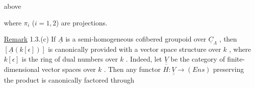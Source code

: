 \begin{center}
  above  
\end{center}
where  $\pi_{i}$  ($i = 1,2$)  are projections.

\underline{Remark} 1.3.(c)  If  $\underline{A}$  is a semi-homogeneous cofibered groupoid over  $\underline{C}_{\Lambda}$ , then
 $[\underline{A}(k [\epsilon])]$ is canonically provided with a vector space structure over  $k$ , where
$k [\epsilon]$ is the ring of dual numbers over  $k$ . Indeed, let  $\underline{\underline{V}}$  be the category of
finite-dimensional vector spaces over  $k$ . Then any functor  $H : \underline{\underline{V}} \to (Ens)$
preserving the product is canonically factored through

